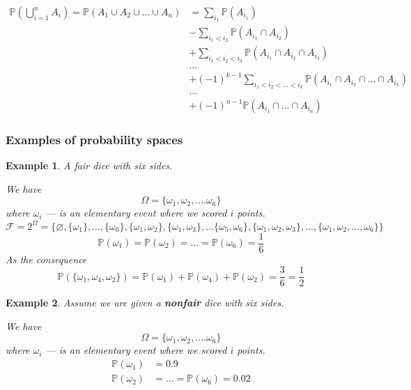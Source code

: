 \documentclass[10pt]{article}
\newtheorem*{example}{Example}
\begin{document}
\begin{align}
    \mathbb{P}\left(
    \bigcup_{i=1}^n A_i\right)
    =\mathbb{P}(A_1\cup A_2\cup \ldots \cup A_n)
     & =\sum_{i_1} \mathbb{P}(A_{i_1})                                     \\
     & -\sum_{i_1<i_2}\mathbb{P}(A_{i_1}\cap A_{i_2})                      \\
     & +\sum_{i_1<i_2<i_3}\mathbb{P}(A_{i_1}\cap A_{i_2}\cap A_{i_3})      \\
     & \ldots                                                              \\
     & +{(-1)}^{k-1}\sum_{i_1<i_2<
        \ldots <i_k}\mathbb{P}(A_{i_1}\cap A_{i_2}\cap\ldots \cap A_{i_k}) \\
     & \ldots                                                              \\
     & +{(-1)}^{n-1}\mathbb{P}(A_{i_1}\cap\ldots\cap A_{i_n})
\end{align}

\subsubsection{Examples of probability spaces}

\begin{example}
    A fair dice with six sides.

    We have
    $$
        \Omega=\{\omega_1,\omega_2,\ldots.\omega_6\}
    $$
    where $\omega_i$ --- is an elementary event where we scored $i$ points.
    $$
        \mathcal{F}=2^\Omega=
        \{
        \varnothing,
        \{\omega_1\},
        \ldots,
        \{\omega_6\},
        \{\omega_1,\omega_2\},
        \{\omega_1,\omega_3\},
        \ldots
        \{\omega_5,\omega_6\},
        \{\omega_1,\omega_2,\omega_3\},
        \ldots,
        \{\omega_1,\omega_2,\ldots,\omega_6\}
        \}
    $$
    $$
        \mathbb{P}(\omega_1)=
        \mathbb{P}(\omega_2)=
        \ldots=
        \mathbb{P}(\omega_6)=
        \frac{1}{6}
    $$
    As the consequence
    $$
        \mathbb{P}(\{\omega_1, \omega_4,\omega_2\})
        =\mathbb{P}(\omega_1)+
        \mathbb{P}(\omega_4)+
        \mathbb{P}(\omega_2)
        =\frac{3}{6}
        =\frac{1}{2}
    $$
\end{example}

\begin{example}

    Assume we are given a \textbf{nonfair} dice with six sides.

    We have
    $$
        \Omega=\{\omega_1,\omega_2,\ldots.\omega_6\}
    $$
    where $\omega_i$ --- is an elementary event where we scored $i$ points.
    \begin{align}
        \mathbb{P}(\omega_1) &
        = 0.9                  \\
        \mathbb{P}(\omega_2) &
        = \ldots
        = \mathbb{P}(\omega_6)=0.02 %
    \end{align}

\end{example}
\end{document}
